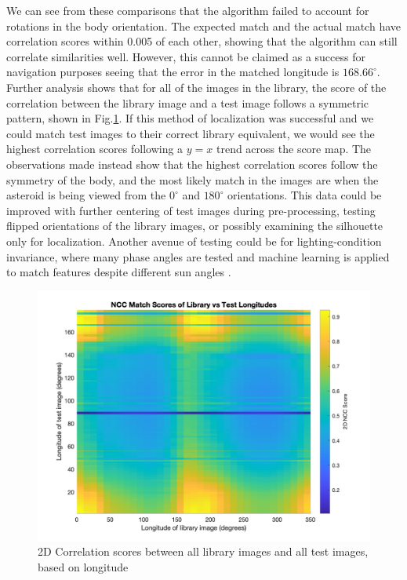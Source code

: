 We can see from these comparisons that the algorithm failed to account for rotations in the body orientation. The expected match and the actual match have correlation scores within 0.005 of each other, showing that the algorithm can still correlate similarities well. However, this cannot be claimed as a success for navigation purposes seeing that the error in the matched longitude is $168.66^{\circ}$. Further analysis shows that for all of the images in the library, the score of the correlation between the library image and a test image follows a symmetric pattern, shown in Fig.\ref{fig:heatmap}. If this method of localization was successful and we could match test images to their correct library equivalent, we would see the highest correlation scores following a $y=x$ trend across the score map. The observations made instead show that the highest correlation scores follow the symmetry of the body, and the most likely match in the images are when the asteroid is being viewed from the $0^{\circ}$ and $180^{\circ}$ orientations. This data could be improved with further centering of test images during pre-processing, testing flipped orientations of the library images, or possibly examining the silhouette only for localization. Another avenue of testing could be for lighting-condition invariance, where many phase angles are tested and machine learning is applied to match features despite different sun angles \cite{Manni2020}. 

\begin{figure}[H]
    \centering
    \includegraphics[width= 1.1\textwidth]{fig/all_scores.png}
    \caption{2D Correlation scores between all library images and all test images, based on longitude}
    \label{fig:heatmap}
\end{figure}

